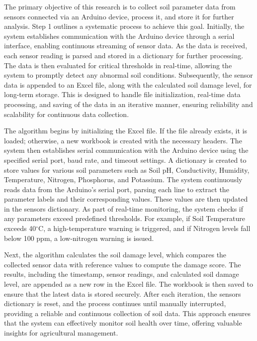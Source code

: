 \documentclass{book} %
\begin{document}
\noindent The primary objective of this research is to collect soil parameter data from sensors connected via an Arduino device, process it, and store it for further analysis. Step 1 outlines a systematic process to achieve this goal. Initially, the system establishes communication with the Arduino device through a serial interface, enabling continuous streaming of sensor data. As the data is received, each sensor reading is parsed and stored in a dictionary for further processing. The data is then evaluated for critical thresholds in real-time, allowing the system to promptly detect any abnormal soil conditions. Subsequently, the sensor data is appended to an Excel file, along with the calculated soil damage level, for long-term storage. This is designed to handle file initialization, real-time data processing, and saving of the data in an iterative manner, ensuring reliability and scalability for continuous data collection.

\noindent The algorithm begins by initializing the Excel file. If the file already exists, it is loaded; otherwise, a new workbook is created with the necessary headers. The system then establishes serial communication with the Arduino device using the specified serial port, baud rate, and timeout settings. A dictionary is created to store values for various soil parameters such as Soil pH, Conductivity, Humidity, Temperature, Nitrogen, Phosphorus, and Potassium. The system continuously reads data from the Arduino's serial port, parsing each line to extract the parameter labels and their corresponding values. These values are then updated in the sensors dictionary. As part of real-time monitoring, the system checks if any parameters exceed predefined thresholds. For example, if Soil Temperature exceeds 40$\mathrm{{}^\circ}$C, a high-temperature warning is triggered, and if Nitrogen levels fall below 100 ppm, a low-nitrogen warning is issued.

\noindent Next, the algorithm calculates the soil damage level, which compares the collected sensor data with reference values to compute the damage score. The results, including the timestamp, sensor readings, and calculated soil damage level, are appended as a new row in the Excel file. The workbook is then saved to ensure that the latest data is stored securely. After each iteration, the sensors dictionary is reset, and the process continues until manually interrupted, providing a reliable and continuous collection of soil data. This approach ensures that the system can effectively monitor soil health over time, offering valuable insights for agricultural management.
\end{document}

